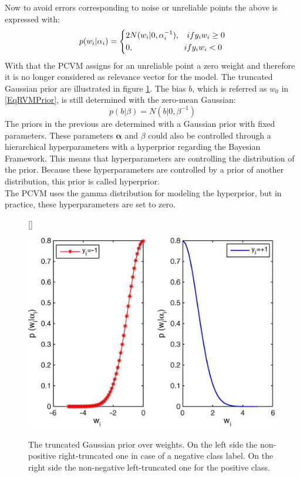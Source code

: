 Now to avoid errors corresponding to noise or unreliable points the above is expressed with:\cite{Chen.2009}
\begin{equation}\label{EqPcvmWSel}
p(w_i \vert \alpha_i) =
\begin{dcases*}
2N(w_i \vert 0,\alpha_i^{-1} ),\>\>\>\>  if y_i w_i \ge 0\\
0				,\>\>\>\>\>\>\>\>\>\>\>\>\>\>\>\>\>\>\>\>\>\>\>\>\>\>\>\> if y_i w_i<0
\end{dcases*}
\end{equation}
With that the \acs{PCVM} assigns for an unreliable point a zero weight and therefore it is no longer considered as relevance vector for the model.
The truncated Gaussian prior are illustrated in figure \ref{FigTruncGaus}.\newline
The bias $b$, which is referred as $w_0$ in \eqref{EqRVMPrior}, is still determined with the zero-mean Gaussian:\cite{Chen.2009}
\begin{equation}\label{EqPcvmBPrior}
p(b \vert \beta) = N(b \vert 0, \beta^{-1})
\end{equation}
The priors in the previous are determined with a Gaussian prior with fixed parameters.
These parameters $\boldsymbol{\alpha }$ and $\beta$ could also be controlled through a hierarchical hyperparameters with a hyperprior regarding the Bayesian Framework.\cite{Chen.2009}
This means that hyperparameters are controlling the distribution of the prior. \cite[p. 71]{Bishop.2009}
Because these hyperparameters are controlled by a prior of another distribution, this prior is called hyperprior.\cite[.p 423]{Bishop.1995}\\
The \acs{PCVM} uses the gamma distribution for modeling the hyperprior, but in practice, these hyperparameters are set to zero.\cite{Chen.2009}
\begin{figure}
	\centering
	[\FBwidth]
	{\caption[Truncated Gaussian Priors over Weights]{The truncated Gaussian prior over weights. On the left side the non-positive right-truncated one in case of a negative class label. On the right side the non-negative left-truncated one for the positive class.\cite{Chen.2009}}}
	{\includegraphics[width=\linewidth]{figures/TuncatedGaussian.png}\label{FigTruncGaus}}
\end{figure}
